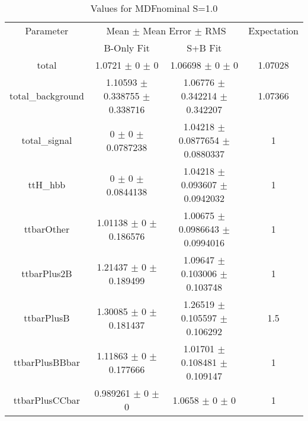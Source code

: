 \begin{table}
\centering
\caption{Values for MDFnominal S=1.0}
\begin{tabular}{cccc}
\toprule
Parameter & \multicolumn{2}{c}{Mean $\pm$ Mean Error $\pm$ RMS} & Expectation\\
 & B-Only Fit & S+B Fit & \\
\midrule
total & \num{1.0721} $\pm$ \num{0} $\pm$ \num{0} & \num{1.06698} $\pm$ \num{0} $\pm$ \num{0} & \num{1.07028}\\
total\_background & \num{1.10593} $\pm$ \num{0.338755} $\pm$ \num{0.338716} & \num{1.06776} $\pm$ \num{0.342214} $\pm$ \num{0.342207} & \num{1.07366}\\
total\_signal & \num{0} $\pm$ \num{0} $\pm$ \num{0.0787238} & \num{1.04218} $\pm$ \num{0.0877654} $\pm$ \num{0.0880337} & \num{1}\\
ttH\_hbb & \num{0} $\pm$ \num{0} $\pm$ \num{0.0844138} & \num{1.04218} $\pm$ \num{0.093607} $\pm$ \num{0.0942032} & \num{1}\\
ttbarOther & \num{1.01138} $\pm$ \num{0} $\pm$ \num{0.186576} & \num{1.00675} $\pm$ \num{0.0986643} $\pm$ \num{0.0994016} & \num{1}\\
ttbarPlus2B & \num{1.21437} $\pm$ \num{0} $\pm$ \num{0.189499} & \num{1.09647} $\pm$ \num{0.103006} $\pm$ \num{0.103748} & \num{1}\\
ttbarPlusB & \num{1.30085} $\pm$ \num{0} $\pm$ \num{0.181437} & \num{1.26519} $\pm$ \num{0.105597} $\pm$ \num{0.106292} & \num{1.5}\\
ttbarPlusBBbar & \num{1.11863} $\pm$ \num{0} $\pm$ \num{0.177666} & \num{1.01701} $\pm$ \num{0.108481} $\pm$ \num{0.109147} & \num{1}\\
ttbarPlusCCbar & \num{0.989261} $\pm$ \num{0} $\pm$ \num{0} & \num{1.0658} $\pm$ \num{0} $\pm$ \num{0} & \num{1}\\
\bottomrule
\end{tabular}
\end{table}